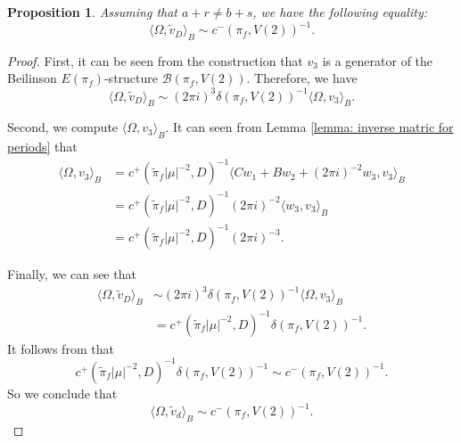 \documentclass[11pt, a4paper]{amsart}
\theoremstyle{plain}
\newtheorem{proposition}[theorem]{Proposition}
\theoremstyle{definition}
\numberwithin{equation}{section}
\begin{document}
\begin{proposition}
\label{prop: periods}
Assuming that $a + r \neq b + s$, we have the following equality:
\begin{equation*}
    \langle \Omega, \tilde{v}_D \rangle_{B} \sim  c^{-}(\pi_f, V(2))^{-1}. 
\end{equation*}
    
\end{proposition}

\begin{proof}
    \par First, it can be seen from the construction that $v_3$ is a generator of the Beilinson $E(\pi_f)$-structure $\mathcal{B}(\pi_f, V(2))$. Therefore, we have 
    \begin{equation*}
        \langle \Omega, \tilde{v}_D \rangle_{B} \sim (2\pi i)^{3} \delta(\pi_f, V(2))^{-1} \langle \Omega, v_3 \rangle_{B}. 
    \end{equation*}
    \par Second, we compute $\langle \Omega, v_3 \rangle_{B}$. It can seen from Lemma \ref{lemma: inverse matric for periods} that 
    \begin{align*}
        \langle \Omega, v_3 \rangle_{B} &= c^{+}(\tilde{\pi}_{f}|\mu|^{-2}, D)^{-1}\langle Cw_1 + Bw_2 + (2\pi i)^{-2}w_3, v_3 \rangle_{B} \\
                                    &= c^{+}(\tilde{\pi}_{f}|\mu|^{-2}, D)^{-1} (2\pi i)^{-2} \langle w_3, v_3 \rangle_{B} \\
                                    &= c^{+}(\tilde{\pi}_{f}|\mu|^{-2}, D)^{-1} (2\pi{i})^{-3}. 
    \end{align*}
    \par Finally, we can see that 
    \begin{align*}
         \langle \Omega, \tilde{v}_D \rangle_{B} & \sim (2\pi i)^{3} \delta(\pi_f, V(2))^{-1} \langle \Omega, v_3 \rangle_{B} \\
                                           & = c^{+}(\tilde{\pi}_{f}|\mu|^{-2}, D)^{-1} \delta(\pi_f, V(2))^{-1}. 
    \end{align*}
    It follows from \cite[(5.1.7)]{Deligne79} that 
    \begin{equation*}
        c^{+}(\tilde{\pi}_{f}|\mu|^{-2}, D)^{-1} \delta(\pi_f, V(2))^{-1} \sim c^{-}(\pi_f, V(2))^{-1}. 
    \end{equation*}
    So we conclude that 
    \begin{equation*}
        \langle \Omega, \tilde{v}_d \rangle_{B} \sim c^{-}(\pi_f, V(2))^{-1}. 
    \end{equation*}
\end{proof}
\end{document}
